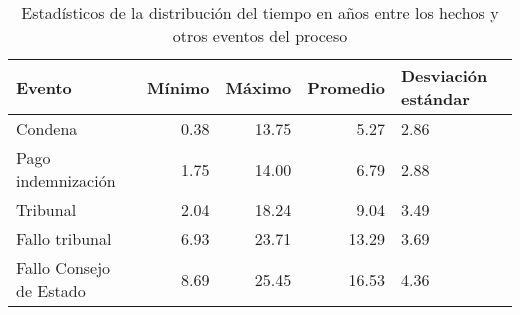 \begin{table}[h]
\centering
\caption{Estadísticos de la distribución del
tiempo en años entre los hechos y otros eventos del proceso} 
\label{tab:hechos-evento}
\begin{tabular}{lrrrp{}}
  \hline
Evento & Mínimo & Máximo & Promedio & Desviación estándar \\ 
  \hline
Condena & 0.38 & 13.75 & 5.27 & 2.86 \\ 
  Pago indemnización & 1.75 & 14.00 & 6.79 & 2.88 \\ 
  Tribunal & 2.04 & 18.24 & 9.04 & 3.49 \\ 
  Fallo tribunal & 6.93 & 23.71 & 13.29 & 3.69 \\ 
  Fallo Consejo de Estado & 8.69 & 25.45 & 16.53 & 4.36 \\ 
   \hline
\end{tabular}
\end{table}
